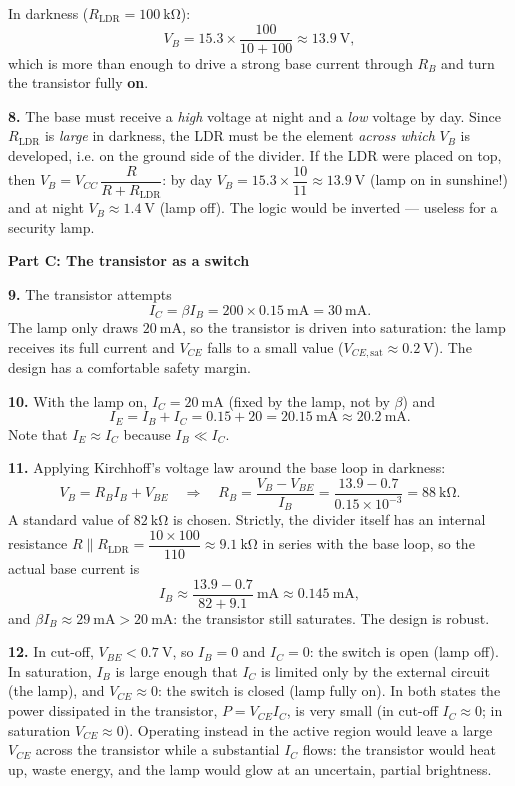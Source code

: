 \documentclass[11pt]{article}
\newcommand{\cle}[1]{{\popxbold\color{popdark}#1}}
\begin{document}
In darkness ($R_{\mathrm{LDR}} = 100\ \mathrm{k\Omega}$):
\[
V_B = 15.3 \times \frac{100}{10 + 100} \approx 13.9\ \mathrm{V},
\]
which is more than enough to drive a strong base current through $R_B$ and turn the transistor fully \textbf{on}.

\textbf{8.} The base must receive a \emph{high} voltage at night and a \emph{low} voltage by day. Since $R_{\mathrm{LDR}}$ is \emph{large} in darkness, the LDR must be the element \emph{across which} $V_B$ is developed, i.e. on the ground side of the divider. If the LDR were placed on top, then $V_B = V_{CC}\,\dfrac{R}{R + R_{\mathrm{LDR}}}$: by day $V_B = 15.3 \times \dfrac{10}{11} \approx 13.9\ \mathrm{V}$ (lamp on in sunshine!) and at night $V_B \approx 1.4\ \mathrm{V}$ (lamp off). The logic would be inverted — useless for a security lamp.

\textbf{Part C: The transistor as a switch}\par

\textbf{9.} The transistor attempts
\[
I_C = \beta I_B = 200 \times 0.15\ \mathrm{mA} = 30\ \mathrm{mA}.
\]
The lamp only draws $20\ \mathrm{mA}$, so the transistor is driven into \cle{saturation}: the lamp receives its full current and $V_{CE}$ falls to a small value ($V_{CE,\mathrm{sat}} \approx 0.2\ \mathrm{V}$). The design has a comfortable safety margin.

\textbf{10.} With the lamp on, $I_C = 20\ \mathrm{mA}$ (fixed by the lamp, not by $\beta$) and
\[
I_E = I_B + I_C = 0.15 + 20 = 20.15\ \mathrm{mA} \approx 20.2\ \mathrm{mA}.
\]
Note that $I_E \approx I_C$ because $I_B \ll I_C$.

\textbf{11.} Applying Kirchhoff's voltage law around the base loop in darkness:
\[
V_B = R_B I_B + V_{BE}
\quad\Longrightarrow\quad
R_B = \frac{V_B - V_{BE}}{I_B} = \frac{13.9 - 0.7}{0.15\times 10^{-3}} = 88\ \mathrm{k\Omega}.
\]
A standard value of $82\ \mathrm{k\Omega}$ is chosen. Strictly, the divider itself has an internal resistance $R \parallel R_{\mathrm{LDR}} = \dfrac{10 \times 100}{110} \approx 9.1\ \mathrm{k\Omega}$ in series with the base loop, so the actual base current is
\[
I_B \approx \frac{13.9 - 0.7}{82 + 9.1}\ \mathrm{mA} \approx 0.145\ \mathrm{mA},
\]
and $\beta I_B \approx 29\ \mathrm{mA} > 20\ \mathrm{mA}$: the transistor still saturates. The design is robust.

\textbf{12.} In \cle{cut-off}, $V_{BE} < 0.7\ \mathrm{V}$, so $I_B = 0$ and $I_C = 0$: the switch is open (lamp off). In \cle{saturation}, $I_B$ is large enough that $I_C$ is limited only by the external circuit (the lamp), and $V_{CE} \approx 0$: the switch is closed (lamp fully on). In both states the power dissipated in the transistor, $P = V_{CE}I_C$, is very small (in cut-off $I_C \approx 0$; in saturation $V_{CE} \approx 0$). Operating instead in the active region would leave a large $V_{CE}$ across the transistor while a substantial $I_C$ flows: the transistor would heat up, waste energy, and the lamp would glow at an uncertain, partial brightness.
\end{document}
